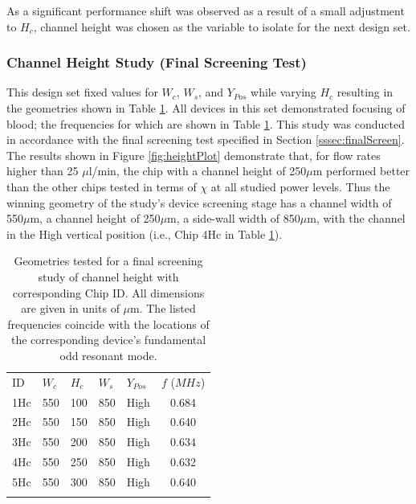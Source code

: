 As a significant performance shift was observed as a result of a small adjustment to $H_c$, channel height was chosen as the variable to isolate for the next design set. 

\subsubsection{Channel Height Study (Final Screening Test)}
\label{sssec:height}

This design set fixed values for $W_c$, $W_s$, and $Y_{Pos}$ while varying $H_c$ resulting in the geometries shown in Table \ref{tab:height}. All devices in this set demonstrated focusing of blood; the frequencies for which are shown in Table \ref{tab:height}. This study was conducted in accordance with the final screening test specified in Section \ref{sssec:finalScreen}. The results shown in Figure \ref{fig:heightPlot} demonstrate that, for flow rates higher than 25 $\mu$l/min, the chip with a channel height of 250$\mu$m performed better than the other chips tested in terms of $\chi$ at all studied power levels. Thus the winning geometry of the study's device screening stage has a channel width of 550$\mu$m, a channel height of 250$\mu$m, a side-wall width of 850$\mu$m, with the channel in the High vertical position (i.e., Chip 4Hc in Table \ref{tab:height}).

\begin{table}[h]
\caption[Geometries tested for a final screening study of channel height]{Geometries tested for a final screening study of channel height with corresponding Chip ID. All dimensions are given in units of $\mu$m. The listed frequencies coincide with the locations of the corresponding device's fundamental odd resonant mode.}
\label{tab:height}       %
\centering
\begin{tabular}{lllll | c}
\hline\noalign{\smallskip}
ID & $W_c$ & $H_c$ & $W_s$ & $Y_{Pos}$ & $f$ ($MHz$)\\
\noalign{\smallskip}\hline\noalign{\smallskip}
1Hc & 550 & 100 & 850 & High & 0.684 \\
2Hc & 550 & 150 & 850 & High & 0.640 \\
3Hc & 550 & 200 & 850 & High & 0.634 \\
4Hc & 550 & 250 & 850 & High & 0.632 \\
5Hc & 550 & 300 & 850 & High & 0.640 \\
\noalign{\smallskip}\hline
\end{tabular}
\end{table}

